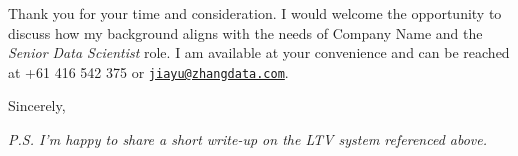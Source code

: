 \documentclass[11pt]{letter}
\makeatletter
\providecommand{\SenderName}{Your Name}
\providecommand{\SenderPhone}{}
\providecommand{\SenderEmail}{}
\renewcommand{\SenderName}{Jiayu Zhang}
\renewcommand{\SenderPhone}{+61 416 542 375}
\renewcommand{\SenderEmail}{jiayu@zhangdata.com}
\newcommand{\CompanyName}{Company Name}
\makeatother
\begin{document}
\begin{letter}{}
Thank you for your time and consideration. I would welcome the opportunity to discuss
how my background aligns with the needs of \CompanyName{} and the \textit{Senior Data Scientist}
role. I am available at your convenience and can be reached at \SenderPhone{} or
\href{mailto:\SenderEmail}{\nolinkurl{\SenderEmail}}.

\closing{Sincerely,}

\signature{\SenderName}

\vspace{0.25em}
\textit{P.S. I’m happy to share a short write-up on the LTV system referenced above.}


\end{letter}
\end{document}
